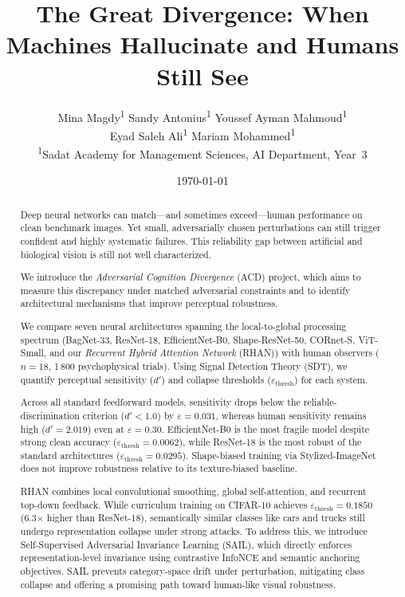 \documentclass[12pt,a4paper]{article}
\title{\textbf{The Great Divergence: When Machines Hallucinate and Humans Still See}}
\author{
    Mina Magdy\textsuperscript{1} \quad
    Sandy Antonius\textsuperscript{1} \quad
    Youssef Ayman Mahmoud\textsuperscript{1} \\[4pt]
    Eyad Saleh Ali\textsuperscript{1} \quad
    Mariam Mohammed\textsuperscript{1} \\[8pt]
    \small\textsuperscript{1}Sadat Academy for Management Sciences,
    AI Department, Year~3
}
\date{\small\today}
\begin{document}
\maketitle
\thispagestyle{empty}

\begin{abstract}
Deep neural networks can match---and sometimes exceed---human performance on
clean benchmark images. Yet small, adversarially chosen perturbations can still
trigger confident and highly systematic failures. This reliability gap between
artificial and biological vision is still not well characterized.

We introduce the \textit{Adversarial Cognition Divergence} (ACD) project, which
aims to measure this discrepancy under matched adversarial constraints and to
identify architectural mechanisms that improve perceptual robustness.

We compare seven neural architectures spanning the local-to-global processing
spectrum (BagNet-33, ResNet-18, EfficientNet-B0, Shape-ResNet-50, CORnet-S,
ViT-Small, and our \textit{Recurrent Hybrid Attention Network} (RHAN)) with human
observers ($n{=}18$, 1\,800 psychophysical trials). Using Signal Detection Theory
(SDT), we quantify perceptual sensitivity ($d'$) and collapse thresholds
($\varepsilon_{\text{thresh}}$) for each system.

Across all standard feedforward models, sensitivity drops below the
reliable-discrimination criterion ($d'{<}1.0$) by $\varepsilon{=}0.031$, whereas
human sensitivity remains high ($d'{=}2.019$) even at $\varepsilon{=}0.30$.
EfficientNet-B0 is the most fragile model despite strong clean accuracy
($\varepsilon_{\text{thresh}}{=}0.0062$), while ResNet-18 is the most robust of
the standard architectures ($\varepsilon_{\text{thresh}}{=}0.0295$). Shape-biased
training via Stylized-ImageNet does not improve robustness relative to its
texture-biased baseline.

RHAN combines local convolutional smoothing, global self-attention, and recurrent top-down feedback. While curriculum training on CIFAR-10 achieves $\varepsilon_{\text{thresh}}{=}0.1850$ (6.3$\times$ higher than ResNet-18), semantically similar classes like cars and trucks still undergo representation collapse under strong attacks. To address this, we introduce Self-Supervised Adversarial Invariance Learning (SAIL), which directly enforces representation-level invariance using contrastive InfoNCE and semantic anchoring objectives. SAIL prevents category-space drift under perturbation, mitigating class collapse and offering a promising path toward human-like visual robustness.
\end{abstract}
\end{document}
